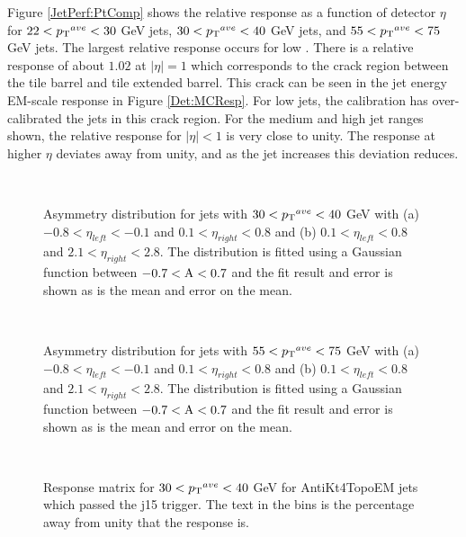 Figure \ref{JetPerf:PtComp} shows the relative response as a function of detector $\eta$ for $22<\mbox{$\mbox{$p_{\rm T}$}{}^{ave}$}{}<30$ GeV jets, $30<\ptave{}<40$ GeV jets, and $55<\ptave{}<75$ GeV jets. 
The largest relative response occurs for low \ptave{}.
There is a relative response of about $1.02$ at $|\eta|=1$ which corresponds to the crack region between the tile barrel and tile extended barrel. 
This crack can be seen in the jet energy EM-scale response in Figure \ref{Det:MCResp}.
For low \pt{} jets, the calibration has over-calibrated the jets in this crack region. 
For the medium and high jet \pt{} ranges shown, the relative response for $|\eta|<1$ is very close to unity.
The response at higher $\eta{}$ deviates away from unity, and as the jet \pt{} increases this deviation reduces. 

\begin{figure}
\centering
\mbox{
}
\caption[Example asymmetry distribution for jets with $30<\ptave{}<40$ GeV]{
Asymmetry distribution for jets with $30<\ptave{}<40$ GeV with (a) $-0.8<\eta_{left}<-0.1$ and $0.1<\eta_{right}<0.8$ and (b)  $0.1<\eta_{left}<0.8$ and $2.1<\eta_{right}<2.8$.
The distribution is fitted using a Gaussian function between $\rm{-0.7<A<0.7}$ and the fit result and error is shown as is the mean and error on the mean. 
\label{JetPerf:Asym_j15}}
\end{figure}

\begin{figure}
\centering
\mbox{
}
\caption[Example asymmetry distribution for jets with $55<\ptave{}<75$ GeV]{
Asymmetry distribution for jets with $55<\ptave{}<75$ GeV with (a) $-0.8<\eta_{left}<-0.1$ and $0.1<\eta_{right}<0.8$ and (b)  $0.1<\eta_{left}<0.8$ and $2.1<\eta_{right}<2.8$.
The distribution is fitted using a Gaussian function between $\rm{-0.7<A<0.7}$ and the fit result and error is shown as is the mean and error on the mean. 
\label{JetPerf:Asym_j30}}
\end{figure}

\begin{figure}
\centering
\mbox{
}
\caption[The response matrix for jets with $30<\ptave{}<40$ GeV]{
Response matrix for $30<\ptave{}<40$ GeV for AntiKt4TopoEM jets which passed the j15 trigger. 
The text in the bins is the percentage away from unity that the response is.
\label{JetPerf:ResponseMatrix_30_40_j15}}
\end{figure}

